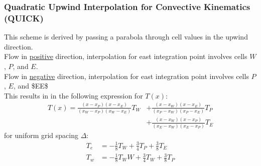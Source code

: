 \documentclass[11pt]{article}
\begin{document}
\subsubsection{Quadratic Upwind Interpolation for Convective Kinematics (QUICK)}
\label{sec:org65761ce}
This scheme is derived by passing a parabola through cell values in the upwind direction. \\
Flow in \uline{positive} direction, interpolation for east integration point involves cells \(W\), \(P\), and \(E\).\\
Flow in \uline{negative} direction, interpolation for east integration point involves cells \(P\), \(E\), and \$EE\$\\
This results in in the following expression for \(T(x)\):
\begin{equation*}
\begin{aligned}
T(x) = \frac{(x-x_P)(x-x_E)}{(x_W-x_P)(x_W-x_E)}T_W &+ \frac{(x-x_W)(x-x_E)}{(x_P-x_W)(x_P-x_E)}T_P\\
&+\frac{(x-x_W)(x-x_P)}{(x_E-x_W)(x_E-x_P)}T_E
\end{aligned}
\end{equation*}
for uniform grid spacing \(\Delta\):
\begin{equation*}
\begin{aligned}
T_e &= -\frac{1}{8}T_W + \frac{3}{4}T_P + \frac{3}{8}T_E\\
T_w &= -\frac{1}{8}T_WW + \frac{3}{4}T_W + \frac{3}{8}T_P
\end{aligned}
\end{equation*}
\end{document}
